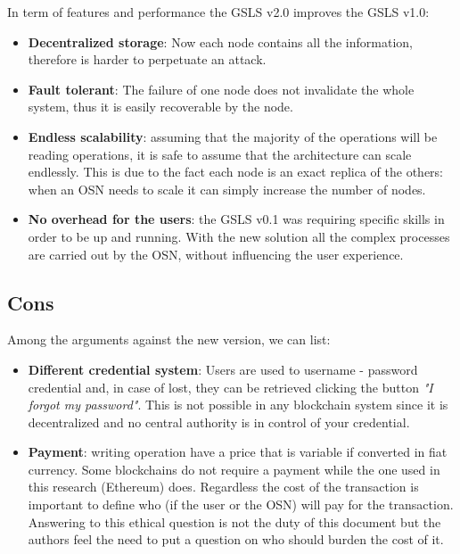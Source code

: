 In term of features and performance the GSLS v2.0 improves the GSLS v1.0:

\begin{itemize}
    \item \textbf{Decentralized storage}: Now each node contains all the information, therefore is harder to perpetuate an attack.
    \item \textbf{Fault tolerant}: The failure of one node does not invalidate the whole system, thus it is easily recoverable by the node.
    \item \textbf{Endless scalability}: assuming that the majority of the operations will be reading operations, it is safe to assume that the architecture can scale endlessly. This is due to the fact each node is an exact replica of the others: when an OSN needs to scale it can simply increase the number of nodes.
    \item \textbf{No overhead for the users}: the GSLS v0.1 was requiring specific skills in order to be up and running. With the new solution all the complex processes are carried out by the OSN, without influencing the user experience.
\end{itemize}


\subsection{Cons}

Among the arguments against the new version, we can list: 

\begin{itemize}
    \item \textbf{Different credential system}: Users are used to username - password credential and, in case of lost, they can be retrieved clicking the button \textit{"I forgot my password"}. This is not possible in any blockchain system since it is decentralized and no central authority is in control of your credential.
    \item \textbf{Payment}: writing operation have a price that is variable if converted in fiat currency. Some blockchains do not require a payment while the one used in this research (Ethereum) does. Regardless the cost of the transaction is important to define who (if the user or the OSN) will pay for the transaction. Answering to this ethical question is not the duty of this document but the authors feel the need to put a question on who should burden the cost of it.
\end{itemize}


